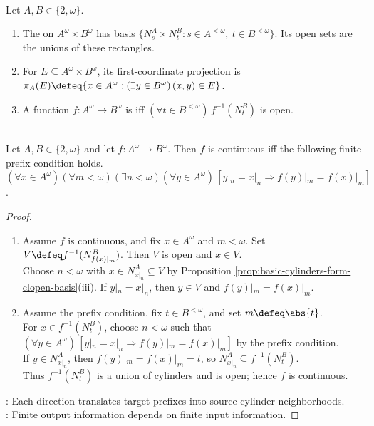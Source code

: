 \begin{definition} \label{def:baire-cantor-products-projections-and-continuity} \\
Let $A,B\in\{2,\omega\}$.
\begin{enumerate}[label=(\roman*)]
\setlength{\itemsep}{0pt}
\item The  on $A^\omega\times B^\omega$ has basis $\{N_s^A\times N_t^B:s\in A^{<\omega},\ t\in B^{<\omega}\}$. Its open sets are the unions of these rectangles.
\item For $E\subseteq A^\omega\times B^\omega$, its first-coordinate projection is $\pi_A(E)\defeq\{x\in A^\omega:(\exists y\in B^\omega)\,(x,y)\in E\}$.
\item A function $f:A^\omega\to B^\omega$ is  iff $(\forall t\in B^{<\omega})\,f^{-1}(N_t^B)$ is open.
\end{enumerate}
\end{definition}

\begin{proposition} \label{prop:continuity-by-finite-prefixes} \\
Let $A,B\in\{2,\omega\}$ and let $f:A^\omega\to B^\omega$. Then $f$ is continuous iff the following finite-prefix condition holds.\\
$(\forall x\in A^\omega)(\forall m<\omega)(\exists n<\omega)(\forall y\in A^\omega)\,[y|_n=x|_n\Longrightarrow f(y)|_m=f(x)|_m]$.
\begin{proof}
\begin{enumerate}[label=\roman*.]
\setlength{\itemsep}{0pt}
\item[$(\Rightarrow)$] Assume $f$ is continuous, and fix $x\in A^\omega$ and $m<\omega$. Set $V\defeq f^{-1}(N_{f(x)|_m}^B)$. Then $V$ is open and $x\in V$.\\
Choose $n<\omega$ with $x\in N_{x|_n}^A\subseteq V$ by Proposition \ref{prop:basic-cylinders-form-clopen-basis}(iii). If $y|_n=x|_n$, then $y\in V$ and $f(y)|_m=f(x)|_m$.
\item[$(\Leftarrow)$] Assume the prefix condition, fix $t\in B^{<\omega}$, and set $m\defeq\abs{t}$.\\
For $x\in f^{-1}(N_t^B)$, choose $n<\omega$ such that $(\forall y\in A^\omega)\,[y|_n=x|_n\Rightarrow f(y)|_m=f(x)|_m]$ by the prefix condition.\\
If $y\in N_{x|_n}^A$, then $f(y)|_m=f(x)|_m=t$, so $N_{x|_n}^A\subseteq f^{-1}(N_t^B)$.\\
Thus $f^{-1}(N_t^B)$ is a union of cylinders and is open; hence $f$ is continuous.
\end{enumerate}
: Each direction translates target prefixes into source-cylinder neighborhoods.\\
: Finite output information depends on finite input information.
\end{proof}
\end{proposition}

